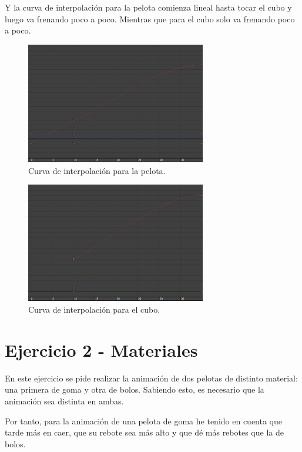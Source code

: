 \documentclass{article}
\begin{document}
Y la curva de interpolación para la pelota comienza lineal hasta tocar el cubo y luego va frenando poco a poco. Mientras que para el cubo solo va frenando poco a poco.

\bigskip

\begin{figure}[H]
    \centering
    \includegraphics[width=0.7\textwidth]{imagenes/Ejercicio 1/curva_p2.png}
    \caption{Curva de interpolación para la pelota.}
\end{figure}

\begin{figure}[H]
    \centering
    \includegraphics[width=0.7\textwidth]{imagenes/Ejercicio 1/curva_c2.png}
    \caption{Curva de interpolación para el cubo.}
\end{figure}


\section{Ejercicio 2 - Materiales}

En este ejercicio se pide realizar la animación de dos pelotas de distinto material: una primera de goma y otra de bolos. Sabiendo esto, es necesario que la animación sea distinta en ambas.

Por tanto, para la animación de una pelota de goma he tenido en cuenta que tarde más en caer, que su rebote sea más alto y que dé más rebotes que la de bolos.
\end{document}
